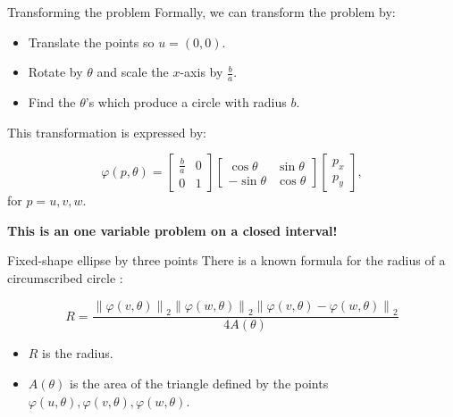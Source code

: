\documentclass{beamer}
\newcommand{\norm}[2][2]{\left\lVert#2\right\rVert_{#1}}
\begin{document}
\begin{frame}{Transforming the problem}
	Formally, we can transform the problem by:
	
	\begin{itemize}
		\item Translate the points so $u=(0, 0)$.
		\item Rotate by $\theta$ and scale the $x$-axis by $\frac{b}{a}$.
		\item Find the $\theta$'s which produce a circle with radius $b$.
	\end{itemize}

	This transformation is expressed by:
	
	\begin{equation*}\label{eq:trpnts}
	\varphi(p, \theta)=\left[\begin{array}{cc}
	\frac{b}{a}&0\\
	0&1
	\end{array}\right]
	\left[\begin{array}{cc}
	\cos{\theta}&\sin{\theta}\\
	-\sin{\theta}&\cos{\theta}
	\end{array}\right]\left[\begin{array}{c}
	p_x\\
	p_y
	\end{array}\right],
	\end{equation*}
	for $p=u, v, w$.
	
	\textbf{This is an one variable problem on a closed interval!}

\end{frame}
	
\begin{frame}{Fixed-shape ellipse by three points}
	There is a known formula for the radius of a circumscribed circle \cite[p.~189]{johnson1960}:

	\begin{equation*}
	R = \dfrac{\norm{\varphi(v, \theta)}\norm{\varphi(w, \theta)}\norm{\varphi(v, \theta)-\varphi(w, \theta)}   }{4A(\theta)}
	\end{equation*}
	
	\begin{itemize}
		\item $R$ is the radius.
		\item $A(\theta)$ is the area of the triangle defined by the points $\varphi(u, \theta), \varphi(v, \theta), \varphi(w, \theta)$.
	\end{itemize}
	\vspace{\baselineskip}
	

												
\end{frame}
\end{document}
